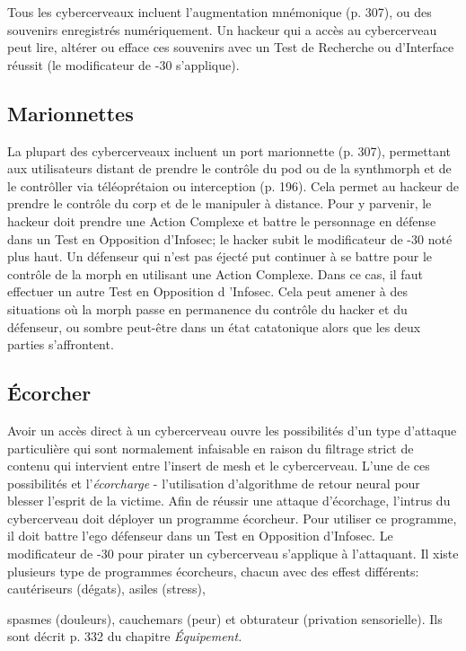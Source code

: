 Tous les cybercerveaux incluent l'augmentation mnémonique (p. 307), ou des souvenirs enregistrés numériquement. Un hackeur qui a accès au cybercerveau peut lire, altérer ou efface ces souvenirs avec un Test de Recherche ou d'Interface réussit (le modificateur de -30 s'applique). 

\subsection{Marionnettes} 

La plupart des cybercerveaux incluent un port marionnette (p. 307), permettant aux utilisateurs distant de prendre le contrôle du pod ou de la synthmorph et de le contrôller via téléoprétaion ou interception (p. 196). Cela permet au hackeur de prendre le contrôle du corp et de le manipuler à distance. Pour y parvenir, le hackeur doit prendre une Action Complexe et battre le personnage en défense dans un Test en Opposition d'Infosec; le hacker subit le modificateur de -30 noté plus haut. Un défenseur qui n'est pas éjecté put continuer à se battre pour le contrôle de la morph en utilisant une Action Complexe. Dans ce cas, il faut effectuer un autre Test en Opposition d 'Infosec. Cela peut amener à des situations où la morph passe en permanence du contrôle du hacker et du défenseur, ou sombre peut-être dans un état catatonique alors que les deux parties s'affrontent. 

\subsection{Écorcher} 

Avoir un accès direct à un cybercerveau ouvre les possibilités d'un type d'attaque particulière qui sont normalement infaisable en raison du filtrage strict de contenu qui intervient entre l'insert de mesh et le cybercerveau. L'une de ces possibilités et l'\textit{écorcharge} - l'utilisation d'algorithme de retour neural pour blesser l'esprit de la victime. Afin de réussir une attaque d'écorchage, l'intrus du cybercerveau doit déployer un programme écorcheur. Pour utiliser ce programme, il doit battre l'ego défenseur dans un Test en Opposition d'Infosec. Le modificateur de -30 pour pirater un cybercerveau s'applique à l'attaquant. Il xiste plusieurs type de programmes écorcheurs, chacun avec des effest différents: cautériseurs (dégats), asiles (stress), 

spasmes (douleurs), cauchemars (peur) et obturateur (privation sensorielle). Ils sont décrit p. 332 du chapitre \textit{Équipement.} 

